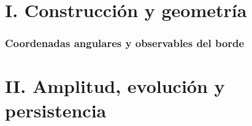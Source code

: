 
\clearpage
{\setlength{\parskip}{0pt}\fontsize{10}{12}\selectfont\tableofcontents}
\clearpage
\part*{I. Construcción y geometría}

\clearpage
\clearpage

\clearpage


\clearpage

\clearpage
\clearpage


\clearpage


\clearpage

\clearpage

\clearpage

\clearpage

\clearpage
\section{Coordenadas angulares y observables del borde}

\clearpage

\clearpage

\clearpage

\clearpage

\clearpage

\clearpage

\clearpage

\clearpage

\clearpage
\part*{II. Amplitud, evolución y persistencia}

\clearpage

\clearpage

\clearpage

\clearpage

\clearpage

\clearpage

\clearpage

\clearpage

\clearpage
